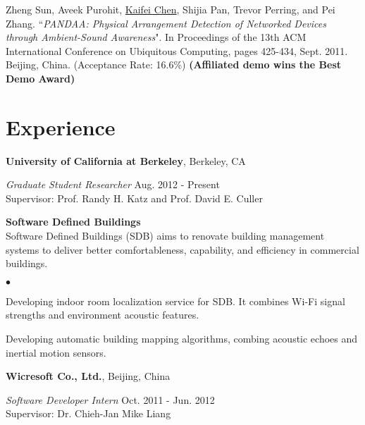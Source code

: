 \documentclass[margin,line]{res}
\newenvironment{list1}{
  \begin{list}{\ding{113}}{
      \setlength{\itemsep}{0in}
      \setlength{\parsep}{0in} \setlength{\parskip}{0in}
      \setlength{\topsep}{0in} \setlength{\partopsep}{0in}
      \setlength{\leftmargin}{0.17in}}}{\end{list}}
\newenvironment{list2}{
  \begin{list}{$\bullet$}{
      \setlength{\itemsep}{0in}
      \setlength{\parsep}{0in} \setlength{\parskip}{0in}
      \setlength{\topsep}{0in} \setlength{\partopsep}{0in}
      \setlength{\leftmargin}{0.2in}}}{\end{list}}
\begin{document}
\begin{resume}
      \vspace*{-2.0mm}
      Zheng Sun, Aveek Purohit, \underline{Kaifei Chen}, Shijia Pan, Trevor Perring, and Pei Zhang. ``{\it PANDAA: Physical Arrangement Detection of Networked Devices through Ambient-Sound Awareness}". In Proceedings of the 13th ACM International Conference on Ubiquitous Computing, pages 425-434, Sept. 2011. Beijing, China. (Acceptance Rate: 16.6\%) {\bf (Affiliated demo wins the Best Demo Award)}


    \section{\sc Experience}

      {\bf University of California at Berkeley}, Berkeley, CA

      \vspace{-.3cm}
      {\em Graduate Student Researcher} \hfill Aug. 2012 - Present\\
      Supervisor: Prof. Randy H. Katz and Prof. David E. Culler\\

      \vspace*{-.1in}
      \begin{list1}
        \item[] {\bf Software Defined Buildings}\\
        Software Defined Buildings (SDB) aims to renovate building management systems to deliver better comfortableness, capability, and efficiency in commercial buildings.
        \vspace*{.05in}
        \begin{list2}
          \item Developing indoor room localization service for SDB. It combines Wi-Fi signal strengths and environment acoustic features. 
          \item Developing automatic building mapping algorithms, combing acoustic echoes and inertial motion sensors.
        \end{list2}
      \end{list1}


      {\bf Wicresoft Co., Ltd.}, Beijing, China

      \vspace{-.3cm}
      {\em Software Developer Intern} \hfill Oct. 2011 - Jun. 2012\\
      Supervisor: Dr. Chieh-Jan Mike Liang\\


\end{resume}
\end{document}
